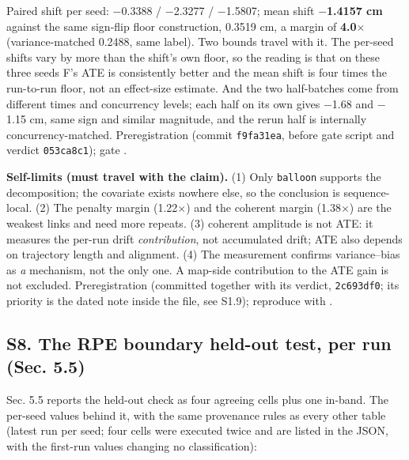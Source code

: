 Paired shift per seed: $-$0.3388 / $-$2.3277 / $-$1.5807; mean shift \textbf{$-$1.4157 cm} against the same sign-flip floor construction, 0.3519 cm, a margin of \textbf{4.0$\times$} (variance-matched 0.2488, same label). Two bounds travel with it. The per-seed shifts vary by more than the shift's own floor, so the reading is that on these three seeds F's ATE is consistently better and the mean shift is four times the run-to-run floor, not an effect-size estimate. And the two half-batches come from different times and concurrency levels; each half on its own gives $-$1.68 and $-$1.15 cm, same sign and similar magnitude, and the rerun half is internally concurrency-matched. Preregistration  (commit \texttt{f9fa31ea}, before gate script and verdict \texttt{053ca8c1}); gate .

\textbf{Self-limits (must travel with the claim).} (1) Only \texttt{balloon} supports the decomposition; the covariate exists nowhere else, so the conclusion is sequence-local. (2) The penalty margin (1.22$\times$) and the coherent margin (1.38$\times$) are the weakest links and need more repeats. (3) coherent amplitude is not ATE: it measures the per-run drift \emph{contribution}, not accumulated drift; ATE also depends on trajectory length and alignment. (4) The measurement confirms variance--bias as \emph{a} mechanism, not the only one. A map-side contribution to the ATE gain is not excluded. Preregistration  (committed together with its verdict, \texttt{2c693df0}; its priority is the dated note inside the file, see S1.9); reproduce with .




\subsection{S8. The RPE boundary held-out test, per run (Sec. 5.5)}


Sec. 5.5 reports the held-out check as four agreeing cells plus one in-band. The per-seed values behind it, with the same provenance rules as every other table (latest run per seed; four cells were executed twice and are listed in the JSON, with the first-run values changing no classification):



